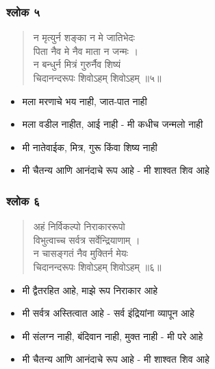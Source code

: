 \begin{frame}[fragile]\frametitle{श्लोक ५}

\begin{verse}
न मृत्युर्न शङ्का न मे जातिभेदः \\
पिता नैव मे नैव माता न जन्मः । \\
न बन्धुर्न मित्रं गुरुर्नैव शिष्यं \\
चिदानन्दरूपः शिवोऽहम् शिवोऽहम् ॥५॥
\end{verse}

	\begin{itemize}
	\item मला मरणाचे भय नाही, जात-पात नाही
	\item मला वडील नाहीत, आई नाही - मी कधीच जन्मलो नाही
	\item मी नातेवाईक, मित्र, गुरू किंवा शिष्य नाही
	\item मी चैतन्य आणि आनंदाचे रूप आहे - मी शाश्वत शिव आहे
	\end{itemize}

\end{frame}

\begin{frame}[fragile]\frametitle{श्लोक ६}

\begin{verse}
अहं निर्विकल्पो निराकाररूपो \\
विभुत्वाच्च सर्वत्र सर्वेन्द्रियाणाम् । \\
न चासङ्गतं नैव मुक्तिर्न मेयः \\
चिदानन्दरूपः शिवोऽहम् शिवोऽहम् ॥६॥
\end{verse}

	\begin{itemize}
	\item मी द्वैतरहित आहे, माझे रूप निराकार आहे
	\item मी सर्वत्र अस्तित्वात आहे - सर्व इंद्रियांना व्यापून आहे
	\item मी संलग्न नाही, बंदिवान नाही, मुक्त नाही - मी परे आहे
	\item मी चैतन्य आणि आनंदाचे रूप आहे - मी शाश्वत शिव आहे
	\end{itemize}

\end{frame}
